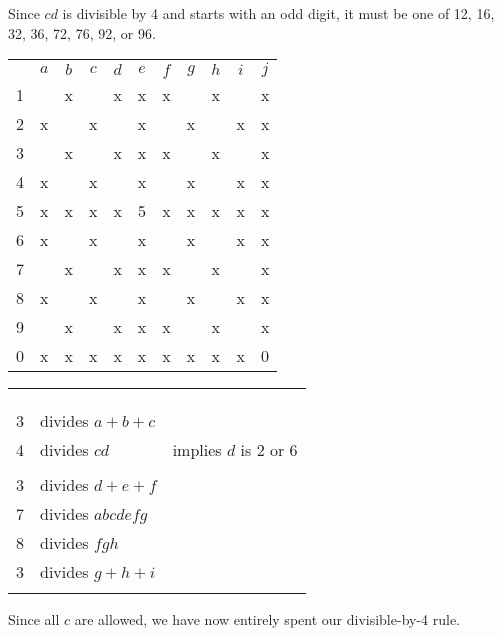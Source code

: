 Since $cd$ is divisible by 4 and starts with an odd digit, it must be one of 12, 16, 32, 36, 72, 76, 92, or 96.
\begin{center}
\begin{tabular}{ccccccccccc}
			&	$a$	&	$b$	&	$c$	&	$d$	&	$e$	&	$f$	&	$g$	&	$h$	&	$i$	&	$j$	\\
	1		&		&	x	&		&	x	&	x	&	x	&		&	x	&		&	x	\\
	2		&	x	&		&	x	&		&	x	&		&	x	&		&	x	&	x	\\
	3		&		&	x	&		&	x	&	x	&	x	&		&	x	&		&	x	\\
	4		&	x	&		&	x	&		&	x	&		&	x	&		&	x	&	x	\\
	5		&	x	&	x	&	x	&	x	&	5	&	x	&	x	&	x	&	x	&	x	\\
	6		&	x	&		&	x	&		&	x	&		&	x	&		&	x	&	x	\\
	7		&		&	x	&		&	x	&	x	&	x	&		&	x	&		&	x	\\
	8		&	x	&		&	x	&		&	x	&		&	x	&		&	x	&	x	\\
	9		&		&	x	&		&	x	&	x	&	x	&		&	x	&		&	x	\\
	0		&	x	&	x	&	x	&	x	&	x	&	x	&	x	&	x	&	x	&	0	\\
\end{tabular}
\hspace{1cm}\vline\hspace{1cm}
\begin{tabular}{rll}
	& 		\\
	& 		\\
	& 		\\
	3	&	divides $a+b+c$					\\
	4	&	divides $cd$				& implies $d$ is 2 or 6	\\
		&	\\
	3	&	divides $d+e+f$					\\
	7	&	divides $abcdefg$				\\
	8	&	divides $fgh$					\\
	3	&	divides $g+h+i$					\\
		&	
\end{tabular}
\end{center}
Since all $c$ are allowed, we have now entirely spent our divisible-by-4 rule.

